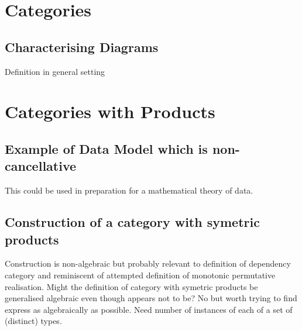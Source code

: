 \documentclass[10pt,a4paper]{scrartcl}
\begin{document}
\section{Categories}


\subsection{Characterising Diagrams}
Definition in general setting

\section{Categories with Products}

\subsection{Example of Data Model which is non-cancellative}
This could be used in preparation for a mathematical theory of data.
\subsection{Construction of a category with symetric products}
Construction is non-algebraic but probably relevant to definition of dependency category
and reminiscent of attempted definition of monotonic permutative realisation.
Might the definition of category with symetric products be generalised algebraic even though appears not to be? No but worth trying to find express as algebraically as possible. Need number of instances of each of a set of (distinct) types. 








\end{document}
